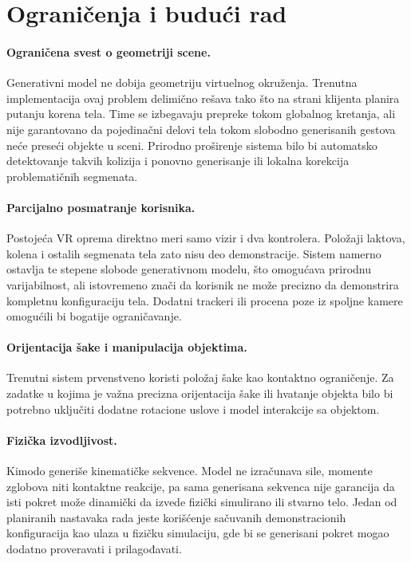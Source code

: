 \documentclass{article}
\begin{document}

\section{Ograničenja i budući rad}
\label{sec:limitations}

\paragraph{Ograničena svest o geometriji scene.}
Generativni model ne dobija geometriju virtuelnog okruženja. Trenutna implementacija ovaj problem delimično rešava tako što na strani klijenta planira putanju korena tela. Time se izbegavaju prepreke tokom globalnog kretanja, ali nije garantovano da pojedinačni delovi tela tokom slobodno generisanih gestova neće preseći objekte u sceni. Prirodno proširenje sistema bilo bi automatsko detektovanje takvih kolizija i ponovno generisanje ili lokalna korekcija problematičnih segmenata.

\paragraph{Parcijalno posmatranje korisnika.}
Postojeća VR oprema direktno meri samo vizir i dva kontrolera. Položaji laktova, kolena i ostalih segmenata tela zato nisu deo demonstracije. Sistem namerno ostavlja te stepene slobode generativnom modelu, što omogućava prirodnu varijabilnost, ali istovremeno znači da korisnik ne može precizno da demonstrira kompletnu konfiguraciju tela. Dodatni trackeri ili procena poze iz spoljne kamere omogućili bi bogatije ograničavanje.

\paragraph{Orijentacija šake i manipulacija objektima.}
Trenutni sistem prvenstveno koristi položaj šake kao kontaktno ograničenje. Za zadatke u kojima je važna precizna orijentacija šake ili hvatanje objekta bilo bi potrebno uključiti dodatne rotacione uslove i model interakcije sa objektom.

\paragraph{Fizička izvodljivost.}
Kimodo generiše kinematičke sekvence. Model ne izračunava sile, momente zglobova niti kontaktne reakcije, pa sama generisana sekvenca nije garancija da isti pokret može dinamički da izvede fizički simulirano ili stvarno telo. Jedan od planiranih nastavaka rada jeste korišćenje sačuvanih demonstracionih konfiguracija kao ulaza u fizičku simulaciju, gde bi se generisani pokret mogao dodatno proveravati i prilagođavati.
\end{document}
